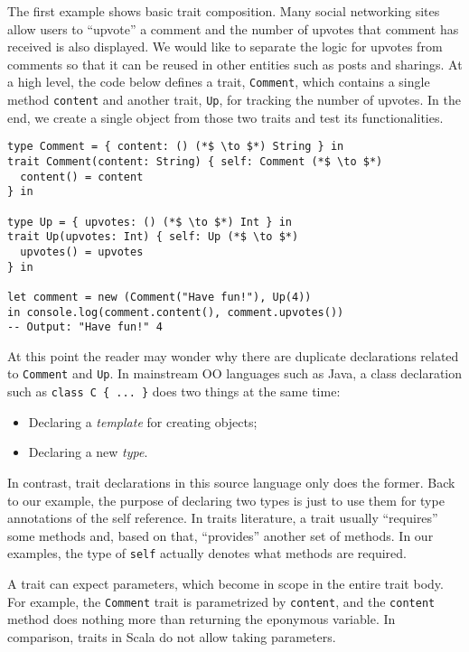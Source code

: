 The first example shows basic trait composition. Many social networking sites
allow users to ``upvote'' a comment and the number of upvotes that comment has
received is also displayed. We would like to separate the logic for upvotes from
comments so that it can be reused in other entities such as posts and sharings.
At a high level, the code below defines a trait, \lstinline$Comment$, which
contains a single method \lstinline$content$ and another trait, \lstinline$Up$,
for tracking the number of upvotes. In the end, we create a single object from
those two traits and test its functionalities.

\begin{lstlisting}
type Comment = { content: () (*$ \to $*) String } in
trait Comment(content: String) { self: Comment (*$ \to $*)
  content() = content
} in

type Up = { upvotes: () (*$ \to $*) Int } in
trait Up(upvotes: Int) { self: Up (*$ \to $*)
  upvotes() = upvotes
} in

let comment = new (Comment("Have fun!"), Up(4))
in console.log(comment.content(), comment.upvotes())
-- Output: "Have fun!" 4
\end{lstlisting}

At this point the reader may wonder why there are duplicate declarations related
to \lstinline$Comment$ and \lstinline$Up$. In mainstream OO languages such as
Java, a class declaration such as \lstinline$class C { ... }$ does two things at
the same time:

\begin{itemize}
\item Declaring a \emph{template} for creating objects;
\item Declaring a new \emph{type}.
\end{itemize}

\noindent In contrast, trait declarations in this source language only does the
former. Back to our example, the purpose of declaring two types is just to use
them for type annotations of the self reference.  In traits literature, a trait
usually ``requires'' some methods and, based on that,  ``provides'' another set
of methods. In our examples, the type of \lstinline$self$ actually denotes what
methods are required.

A trait can expect parameters, which become in scope in the entire trait body.
For example, the \lstinline$Comment$ trait is parametrized by
\lstinline$content$, and the \lstinline$content$ method does nothing more than
returning the eponymous variable. In comparison, traits in Scala do not allow
taking parameters.

